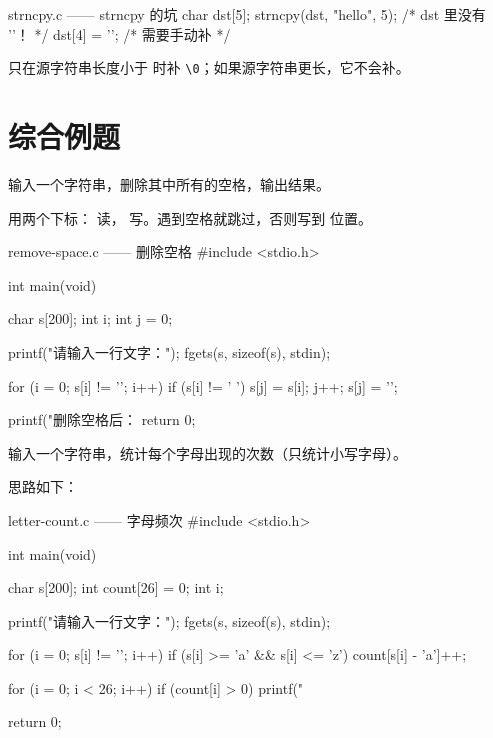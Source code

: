 \begin{pitfall}
\begin{codebox}{strncpy.c —— strncpy 的坑}
char dst[5];
strncpy(dst, "hello", 5);   /* dst 里没有 '\0'！ */
dst[4] = '\0';              /* 需要手动补 */
\end{codebox}
 只在源字符串长度小于  时补 \texttt{\textbackslash0}；如果源字符串更长，它不会补。
\end{pitfall}

\section{综合例题}

\begin{example}
输入一个字符串，删除其中所有的空格，输出结果。
\end{example}
\begin{solution}
用两个下标： 读， 写。遇到空格就跳过，否则写到  位置。

\begin{codebox}{remove-space.c —— 删除空格}
#include <stdio.h>

int main(void)
{
    char s[200];
    int i;
    int j = 0;

    printf("请输入一行文字：");
    fgets(s, sizeof(s), stdin);

    for (i = 0; s[i] != '\0'; i++) {
        if (s[i] != ' ') {
            s[j] = s[i];
            j++;
        }
    }
    s[j] = '\0';

    printf("删除空格后：%
    return 0;
}
\end{codebox}
\end{solution}

\begin{example}
输入一个字符串，统计每个字母出现的次数（只统计小写字母）。
\end{example}
\begin{solution}
思路如下：

\begin{codebox}{letter-count.c —— 字母频次}
#include <stdio.h>

int main(void)
{
    char s[200];
    int count[26] = {0};
    int i;

    printf("请输入一行文字：");
    fgets(s, sizeof(s), stdin);

    for (i = 0; s[i] != '\0'; i++) {
        if (s[i] >= 'a' && s[i] <= 'z') {
            count[s[i] - 'a']++;
        }
    }

    for (i = 0; i < 26; i++) {
        if (count[i] > 0) {
            printf("%
        }
    }

    return 0;
}
\end{codebox}
\end{solution}

